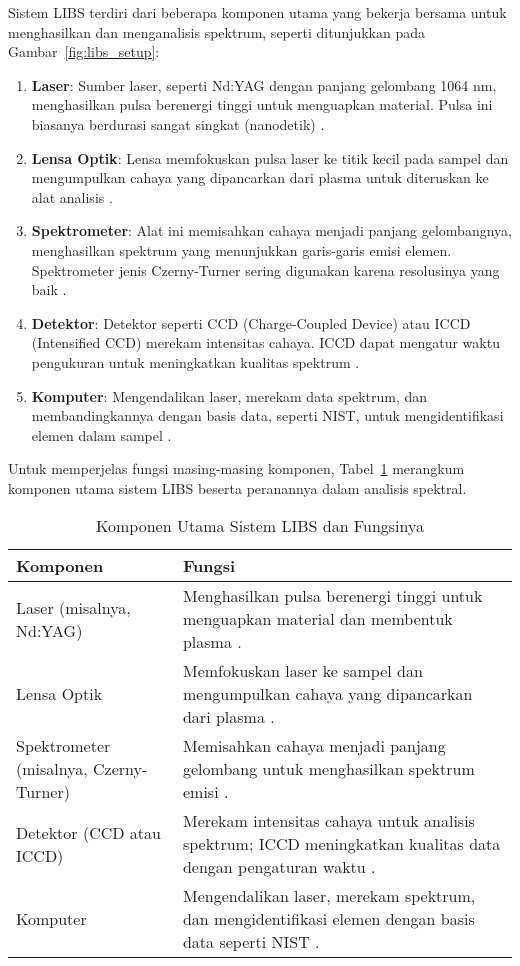 Sistem LIBS terdiri dari beberapa komponen utama yang bekerja bersama untuk menghasilkan dan menganalisis spektrum, seperti ditunjukkan pada Gambar~\ref{fig:libs_setup}:
\begin{enumerate}
    \item \textbf{Laser}: Sumber laser, seperti Nd:YAG dengan panjang gelombang 1064 nm, menghasilkan pulsa berenergi tinggi untuk menguapkan material. Pulsa ini biasanya berdurasi sangat singkat (nanodetik) \citep{Cremers2013}.
    \item \textbf{Lensa Optik}: Lensa memfokuskan pulsa laser ke titik kecil pada sampel dan mengumpulkan cahaya yang dipancarkan dari plasma untuk diteruskan ke alat analisis \citep{Miziolek2006}.
    \item \textbf{Spektrometer}: Alat ini memisahkan cahaya menjadi panjang gelombangnya, menghasilkan spektrum yang menunjukkan garis-garis emisi elemen. Spektrometer jenis Czerny-Turner sering digunakan karena resolusinya yang baik \citep{Singh2007}.
    \item \textbf{Detektor}: Detektor seperti CCD (Charge-Coupled Device) atau ICCD (Intensified CCD) merekam intensitas cahaya. ICCD dapat mengatur waktu pengukuran untuk meningkatkan kualitas spektrum \citep{Cremers2013}.
    \item \textbf{Komputer}: Mengendalikan laser, merekam data spektrum, dan membandingkannya dengan basis data, seperti NIST, untuk mengidentifikasi elemen dalam sampel \citep{Kramida2023}.
\end{enumerate}
Untuk memperjelas fungsi masing-masing komponen, Tabel~\ref{tab:libs_components} merangkum komponen utama sistem LIBS beserta peranannya dalam analisis spektral.

\begin{table}[H]
\centering
\caption{Komponen Utama Sistem LIBS dan Fungsinya}
\label{tab:libs_components}
\begin{tabularx}{\textwidth}{>{\raggedright\arraybackslash}X>{\raggedright\arraybackslash}X}
\toprule
\textbf{Komponen} & \textbf{Fungsi} \\
\midrule
Laser (misalnya, Nd:YAG) & Menghasilkan pulsa berenergi tinggi untuk menguapkan material dan membentuk plasma \citep{Cremers2013}. \\
Lensa Optik & Memfokuskan laser ke sampel dan mengumpulkan cahaya yang dipancarkan dari plasma \citep{Miziolek2006}. \\
Spektrometer (misalnya, Czerny-Turner) & Memisahkan cahaya menjadi panjang gelombang untuk menghasilkan spektrum emisi \citep{Singh2007}. \\
Detektor (CCD atau ICCD) & Merekam intensitas cahaya untuk analisis spektrum; ICCD meningkatkan kualitas data dengan pengaturan waktu \citep{Cremers2013}. \\
Komputer & Mengendalikan laser, merekam spektrum, dan mengidentifikasi elemen dengan basis data seperti NIST \citep{Kramida2023}. \\
\bottomrule
\end{tabularx}
\end{table}
